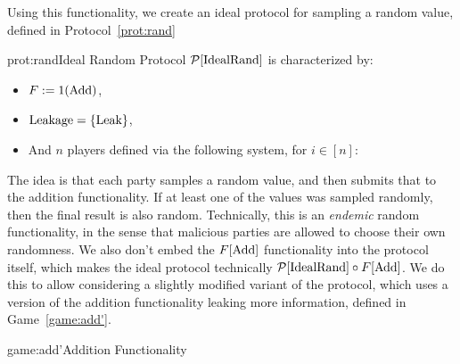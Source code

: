 Using this functionality, we create an ideal protocol for sampling
a random value, defined in Protocol~\ref{prot:rand}

\begin{protocol}{prot:rand}{Ideal Random Protocol}
$\mathcal{P}[\text{IdealRand}]$ is characterized by:
\begin{itemize}
    \item $F := 1(\text{Add})$,
    \item $\text{Leakage} = \{\text{Leak}\}$,
    \item And $n$ players defined via the following system, for $i \in [n]$:
\end{itemize}
\end{protocol}

The idea is that each party samples a random value, and then submits
that to the addition functionality.
If at least one of the values was sampled randomly, 
then the final result is also random.
Technically, this is an \emph{endemic} random functionality,
in the sense that malicious parties are allowed to choose their own randomness.
We also don't embed the $F[\text{Add}]$ functionality into the protocol itself,
which makes the ideal protocol technically $\mathcal{P}[\text{IdealRand}] \circ F[\text{Add}]$.
We do this to allow considering a slightly modified variant of the protocol,
which uses a version of the addition functionality leaking more information,
defined in Game~\ref{game:add'}.

\begin{game}{game:add'}{Addition Functionality}
\end{game}

